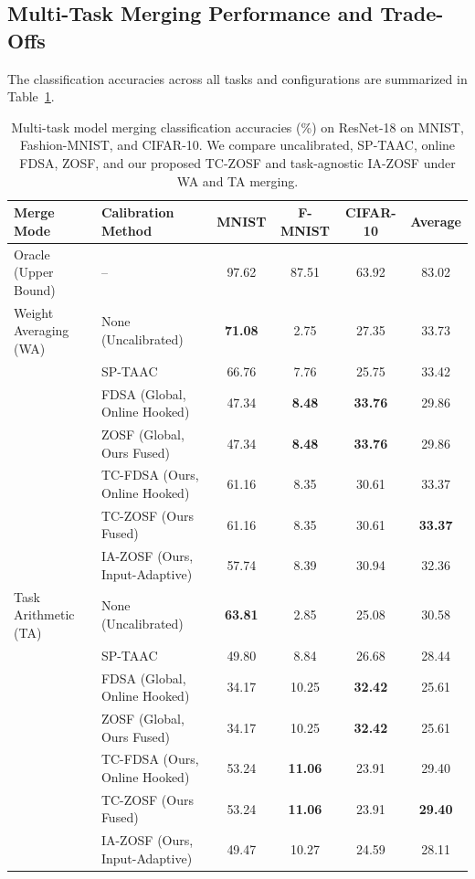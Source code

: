 \documentclass{article}
\theoremstyle{plain}
\theoremstyle{definition}
\theoremstyle{remark}
\begin{document}
\subsection{Multi-Task Merging Performance and Trade-Offs}
The classification accuracies across all tasks and configurations are summarized in Table~\ref{tab:merging}.

\begin{table}[t]
\caption{Multi-task model merging classification accuracies (\%) on ResNet-18 on MNIST, Fashion-MNIST, and CIFAR-10. We compare uncalibrated, SP-TAAC, online FDSA, ZOSF, and our proposed TC-ZOSF and task-agnostic IA-ZOSF under WA and TA merging.}
\label{tab:merging}
\begin{center}
\begin{small}
\begin{sc}
\begin{tabular}{llcccc}
\toprule
Merge Mode & Calibration Method & MNIST & F-MNIST & CIFAR-10 & Average \\
\midrule
Oracle (Upper Bound) & -- & 97.62 & 87.51 & 63.92 & 83.02 \\
\midrule
Weight Averaging (WA) & None (Uncalibrated) & \textbf{71.08} & 2.75 & 27.35 & 33.73 \\
& SP-TAAC & 66.76 & 7.76 & 25.75 & 33.42 \\
& FDSA (Global, Online Hooked) & 47.34 & \textbf{8.48} & \textbf{33.76} & 29.86 \\
& ZOSF (Global, Ours Fused) & 47.34 & \textbf{8.48} & \textbf{33.76} & 29.86 \\
& TC-FDSA (Ours, Online Hooked) & 61.16 & 8.35 & 30.61 & 33.37 \\
& TC-ZOSF (Ours Fused) & 61.16 & 8.35 & 30.61 & \textbf{33.37} \\
& IA-ZOSF (Ours, Input-Adaptive) & 57.74 & 8.39 & 30.94 & 32.36 \\
\midrule
Task Arithmetic (TA) & None (Uncalibrated) & \textbf{63.81} & 2.85 & 25.08 & 30.58 \\
& SP-TAAC & 49.80 & 8.84 & 26.68 & 28.44 \\
& FDSA (Global, Online Hooked) & 34.17 & 10.25 & \textbf{32.42} & 25.61 \\
& ZOSF (Global, Ours Fused) & 34.17 & 10.25 & \textbf{32.42} & 25.61 \\
& TC-FDSA (Ours, Online Hooked) & 53.24 & \textbf{11.06} & 23.91 & 29.40 \\
& TC-ZOSF (Ours Fused) & 53.24 & \textbf{11.06} & 23.91 & \textbf{29.40} \\
& IA-ZOSF (Ours, Input-Adaptive) & 49.47 & 10.27 & 24.59 & 28.11 \\
\bottomrule
\end{tabular}
\end{sc}
\end{small}
\end{center}
\end{table}
\end{document}

